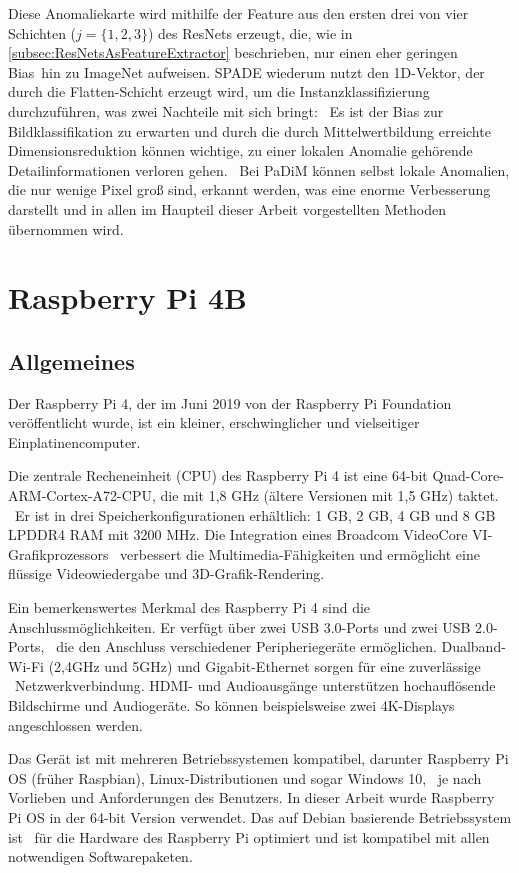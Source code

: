Diese Anomaliekarte wird mithilfe der Feature aus den ersten drei von vier Schichten ($j=\{1,2,3\}$) des ResNets erzeugt, die, wie in \ref{subsec:ResNetsAsFeatureExtractor} beschrieben, nur einen eher geringen \glqq Bias\grqq{}\
hin zu ImageNet aufweisen. SPADE wiederum nutzt den 1D-Vektor, der durch die \glqq Flatten\grqq{}-Schicht erzeugt wird, um die Instanzklassifizierung durchzuführen, was zwei Nachteile mit sich bringt: \
Es ist der Bias zur Bildklassifikation zu erwarten und durch die durch Mittelwertbildung erreichte Dimensionsreduktion können wichtige, zu einer lokalen Anomalie gehörende Detailinformationen verloren gehen. \
Bei PaDiM können selbst lokale Anomalien, die nur wenige Pixel groß sind, erkannt werden, was eine enorme Verbesserung darstellt und in allen im Haupteil dieser Arbeit vorgestellten Methoden übernommen wird. \
\section{Raspberry Pi 4B}\label{sec:RaspberryPi4B}
\subsection{Allgemeines}\label{subsec:RaspberryPi4BAllgemeines}
Der Raspberry Pi 4, der im Juni 2019 von der Raspberry Pi Foundation veröffentlicht wurde, ist ein kleiner, erschwinglicher und vielseitiger Einplatinencomputer. \

Die zentrale Recheneinheit (CPU) des Raspberry Pi 4 ist eine 64-bit Quad-Core-ARM-Cortex-A72-CPU, die mit 1,8 GHz (ältere Versionen mit 1,5 GHz) taktet. \  
Er ist in drei Speicherkonfigurationen erhältlich: 1 GB, 2 GB, 4 GB und 8 GB LPDDR4 RAM mit 3200 MHz. Die Integration eines Broadcom VideoCore VI-Grafikprozessors \
verbessert die Multimedia-Fähigkeiten und ermöglicht eine flüssige Videowiedergabe und 3D-Grafik-Rendering.

Ein bemerkenswertes Merkmal des Raspberry Pi 4 sind die Anschlussmöglichkeiten. Er verfügt über zwei USB 3.0-Ports und zwei USB 2.0-Ports, \ 
die den Anschluss verschiedener Peripheriegeräte ermöglichen. Dualband-Wi-Fi (2,4GHz und 5GHz) und Gigabit-Ethernet sorgen für eine zuverlässige \ 
Netzwerkverbindung. HDMI- und Audioausgänge unterstützen hochauflösende Bildschirme und Audiogeräte. So können beispielsweise zwei 4K-Displays angeschlossen werden. \

Das Gerät ist mit mehreren Betriebssystemen kompatibel, darunter Raspberry Pi OS (früher Raspbian), Linux-Distributionen und sogar Windows 10, \ 
je nach Vorlieben und Anforderungen des Benutzers. In dieser Arbeit wurde Raspberry Pi OS in der 64-bit Version verwendet. Das auf Debian basierende Betriebssystem ist \
für die Hardware des Raspberry Pi optimiert und ist kompatibel mit allen notwendigen Softwarepaketen. \

